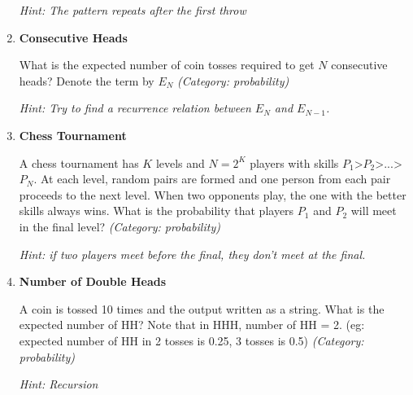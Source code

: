 \begin{enumerate}
\small\emph{Hint: The pattern repeats after the first throw}





\item \textbf{Consecutive Heads}

What is the expected number of coin tosses required to get $N$ consecutive heads?
Denote the term by $E_N$
\small\emph{(Category: probability)}

\small\emph{Hint: Try to find a recurrence relation between $E_{N}$ and $E_{N-1}$.}





\item \textbf{Chess Tournament}

A chess tournament has $K$ levels and $N = 2^K$ players with skills $P_1 $>$ P_2 $>$ ... $>$P_{N}$. At each level, random pairs are formed and one person from each pair proceeds to the next level. When two opponents play, the one with the better skills always wins. What is the probability that players $P_1$ and $P_2$ will meet in the final level?
\small\emph{(Category: probability)}

\small\emph{Hint: if two players meet before the final, they don't meet at the final.}





\item \textbf{Number of Double Heads}

A coin is tossed 10 times and the output written as a string. What is the expected number of HH? Note that in HHH, number of HH = 2. (eg: expected number of HH in 2 tosses is 0.25, 3 tosses is 0.5)
\small\emph{(Category: probability)}

\small\emph{Hint: Recursion}





\end{enumerate}
